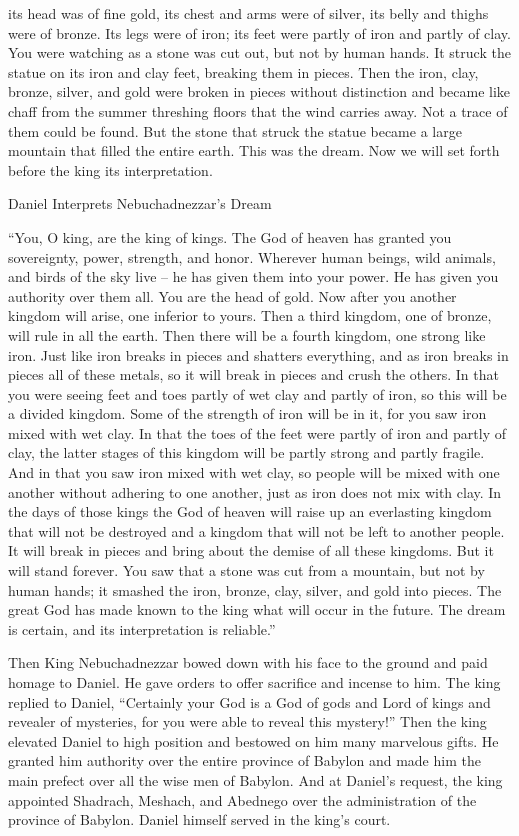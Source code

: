 {its head
was of
fine
gold,
its chest
and arms
were of
silver,
its belly
and thighs
were of
bronze.
Its legs
were of iron;
its feet
were partly
of iron
and partly
of clay.
You were
watching
as
a stone
was cut out,
but
not
by human hands.
It struck
the statue
on
its iron
and clay
feet,
breaking
them in pieces.
Then
the iron,
clay,
bronze,
silver,
and gold
were broken in pieces
without distinction
and became
like chaff
from
the summer
threshing floors
that the wind
carries away.
Not
a trace
of them
could be found.
But the stone
that
struck
the statue
became
a large
mountain
that filled
the entire
earth.
This
was the dream.
Now we will set forth
before
the king
its interpretation.
\par }{\SH Daniel Interprets Nebuchadnezzar’s Dream
\par }{\PP {}“You,
O king,
are the king
of kings.
The God
of heaven
has granted
you sovereignty,
power,
strength,
and honor.
Wherever
human beings,
wild
animals,
and birds
of the sky
live
– he has given
them into your power.
He has given
you
authority over
them all.
You
are the head
of gold.
Now after
you another
kingdom
will arise,
one inferior
to yours. Then
a third
kingdom,
one
of bronze,
will rule
in all
the earth.
Then there will be
a fourth
kingdom,
one strong
like iron.
Just like
iron
breaks in pieces
and shatters
everything,
and as iron
breaks
in pieces
all
of these
metals, so it will break in pieces
and crush the others.
In that
you were seeing
feet
and toes
partly
of wet
clay
and partly
of iron,
so this will be
a divided
kingdom.
Some
of the strength
of iron
will be
in it, for
you saw
iron
mixed
with wet
clay.
In that the toes
of the feet
were partly
of iron
and partly
of clay,
the latter
stages
of this kingdom
will be
partly strong
and partly
fragile.
And in that
you saw
iron
mixed
with wet
clay,
so people
will be
mixed
with one another without
adhering
to
one
another,
just
as
iron
does not
mix
with
clay.
In
the days
of those
kings
the God
of heaven
will raise up
an everlasting
kingdom
that
will not
be destroyed
and a kingdom
that will not
be left
to another
people.
It will break in pieces
and bring about the demise
of all
these
kingdoms.
But it will
stand
forever.
You saw
that
a stone
was cut from
a mountain,
but not
by human hands;
it smashed
the iron,
bronze,
clay,
silver,
and gold
into pieces.
The great
God
has made known
to the king
what
will occur
in the future.
The dream
is certain,
and its interpretation
is reliable.”
\par }{\PP {}Then
King
Nebuchadnezzar
bowed down
with
his face
to the ground and paid homage
to Daniel.
He gave orders
to offer
sacrifice
and incense to him.
The king
replied
to Daniel,
“Certainly
your God
is
a God
of gods
and Lord
of kings
and revealer
of mysteries,
for
you were able
to reveal
this
mystery!”
Then
the king
elevated
Daniel
to high position
and bestowed
on him many
marvelous
gifts.
He granted him authority
over
the entire
province
of Babylon
and made him the main
prefect
over
all
the wise men
of Babylon.
And at Daniel’s
request,
the king
appointed
Shadrach,
Meshach,
and Abednego
over
the administration
of the province
of Babylon.
Daniel
himself served in the king’s
court.

}
